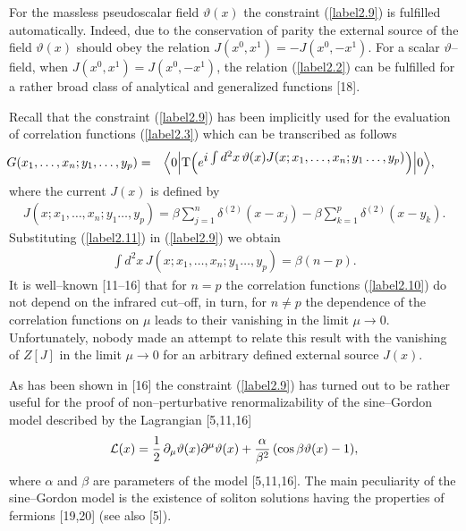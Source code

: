 \documentclass[a4paper,12pt] {article}
\begin{document}
For the massless pseudoscalar field $\vartheta(x)$ the constraint
(\ref{label2.9}) is fulfilled automatically. Indeed, due to the
conservation of parity the external source of the field $\vartheta(x)$
should obey the relation $J(x^0,x^1) = - J(x^0,-x^1)$. For a scalar
$\vartheta$--field, when $J(x^0,x^1) = J(x^0,-x^1)$, the relation
(\ref{label2.2}) can be fulfilled for a rather broad class of
analytical and generalized functions [18].

Recall that the constraint (\ref{label2.9}) has been implicitly used
for the evaluation of correlation functions (\ref{label2.3}) which can
be transcribed as follows
%
\begin{eqnarray}\label{label2.10}
\hspace{-0.3in}G(x_1,\ldots,x_n;y_1,\ldots,y_p) &=& \Big\langle
0\Big|{\rm T}\Big(e^{\textstyle i\int
d^2x\,\vartheta(x)J(x;x_1,\ldots,x_n;y_1\ldots,y_p)}\Big)\Big|0\Big\rangle,
\end{eqnarray}
%
where the current $J(x)$ is defined by 
%
\begin{eqnarray}\label{label2.11}
J(x;x_1,\ldots,x_n;y_1\ldots,y_p) = \beta\sum^n_{j=1}\delta^{(2)}(x -
x_j) - \beta\sum^p_{k=1}\delta^{(2)}(x - y_k).
\end{eqnarray}
%
Substituting (\ref{label2.11}) in (\ref{label2.9}) we obtain
%
\begin{eqnarray}\label{label2.12}
\int d^2x\,J(x;x_1,\ldots,x_n;y_1\ldots,y_p) = \beta (n-p).
\end{eqnarray}
%
It is well--known [11--16] that for $n = p$ the correlation functions
(\ref{label2.10}) do not depend on the infrared cut--off, in turn, for
$n\neq p$ the dependence of the correlation functions on $\mu$ leads
to their vanishing in the limit $\mu \to 0$. Unfortunately, nobody
made an attempt to relate this result with the vanishing of $Z[J]$ in
the limit $\mu \to 0$ for an arbitrary defined external source $J(x)$.

As has been shown in [16] the constraint (\ref{label2.9}) has turned
out to be rather useful for the proof of non--perturbative
renormalizability of the sine--Gordon model described by the
Lagrangian [5,11,16]
%
\begin{eqnarray}\label{label2.13}
{\cal L}(x) =
\frac{1}{2}\,\partial_{\mu}\vartheta(x)\partial^{\mu}\vartheta(x) +
\frac{\alpha}{\beta^2}\,(\cos\beta\vartheta(x) - 1),
\end{eqnarray}
%
where $\alpha$ and $\beta$ are parameters of the model [5,11,16]. The
main peculiarity of the sine--Gordon model is the existence of soliton
solutions having the properties of fermions [19,20] (see also [5]).
\end{document}
